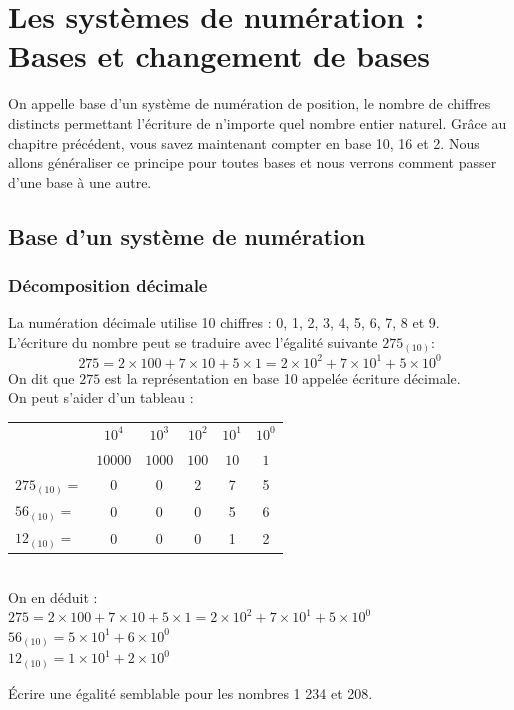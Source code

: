 \setcounter{section}{0}
\renewcommand{\chaptername}{\phantom{Chapitre}}\renewcommand{\thechapter}{}
\chapter{Les systèmes de numération : Bases et changement de bases}


On appelle base d'un système de numération de position, le nombre de chiffres distincts permettant l'écriture de n'importe quel nombre entier naturel. Grâce au chapitre précédent, vous savez maintenant compter en base 10, 16 et 2. Nous allons généraliser ce principe pour toutes bases et nous verrons comment passer d'une base à une autre.\\

\section{Base d'un système de numération}

\subsection{Décomposition décimale}
La numération décimale utilise 10 chiffres : 0, 1, 2, 3, 4, 5, 6, 7, 8 et 9.\\
L'écriture du nombre peut se traduire avec l'égalité suivante $275_{(10)}$:
\[275= 2 \times 100 + 7 \times 10 + 5 \times 1= 2\times10^2 + 7\times10^1+ 5\times10^0\]
On dit que $275$ est la représentation en base 10 appelée écriture décimale.\\

On peut s'aider d'un tableau :
\begin{tabular}{lccccc}
& $10^4$ & $10^3$ & $10^2$ & $10^1$ & $10^0$\\
& $10000$ & $1000$ & $100$ & $10$ & $1$\\
\hline
$275_{(10)} = $ & 0 & 0 & 2 & 7 & 5\\
$56_{(10)} = $ & 0 & 0 & 0 & 5 & 6\\
$12_{(10)} = $ & 0 & 0 & 0 & 1 & 2\\

\end{tabular}\\
On en déduit : \\
$275= 2 \times 100 + 7 \times 10 + 5 \times 1= 2\times10^2 + 7\times10^1+ 5\times10^0$\\
$56_{(10)} = 5\times 10^1 + 6\times 10^0$\\
$12_{(10)} = 1\times 10^1 + 2\times 10^0$\\
\begin{Avous}
    Écrire une égalité semblable pour les nombres 1 234 et 208.\\[4cm]
\end{Avous}

